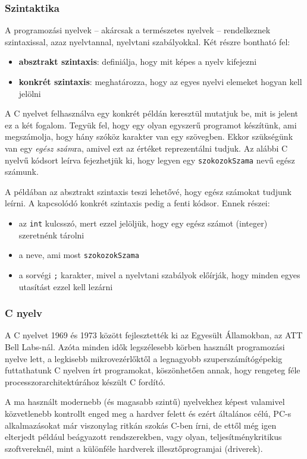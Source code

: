 \subsubsection{Szintaktika} 
A programozási nyelvek -- akárcsak a természetes nyelvek -- rendelkeznek szintaxissal, azaz nyelvtannal, nyelvtani szabályokkal. Két részre bontható fel:
\begin{itemize}
  \item \textbf{absztrakt szintaxis}: definiálja, hogy mit képes a nyelv kifejezni
  \item \textbf{konkrét szintaxis}: meghatározza, hogy az egyes nyelvi elemeket hogyan kell jelölni 
\end{itemize}

A C nyelvet felhasználva egy konkrét példán keresztül mutatjuk be, mit is jelent ez a két fogalom. Tegyük fel, hogy egy olyan egyszerű programot készítünk, ami megszámolja, hogy hány szóköz karakter van egy szövegben. Ekkor szükségünk van egy \emph{egész szám}ra, amivel ezt az értéket reprezentálni tudjuk. Az alábbi C nyelvű kódsort leírva fejezhetjük ki, hogy legyen egy \texttt{szokozokSzama} nevű egész számunk.

\clisting

A példában az absztrakt szintaxis teszi lehetővé, hogy egész számokat tudjunk leírni. A kapcsolódó konkrét szintaxis pedig a fenti kódsor. Ennek részei:
\begin{itemize}
  \item az \texttt{int} kulcsszó, mert ezzel jelöljük, hogy egy egész számot (integer) szeretnénk tárolni
  \item a neve, ami most \texttt{szokozokSzama}
  \item a sorvégi \texttt{;} karakter, mivel a nyelvtani szabályok előírják, hogy minden egyes utasítást ezzel kell lezárni
\end{itemize}


\subsubsection{C nyelv}
A C nyelvet 1969 és 1973 között fejlesztették ki az Egyesült Államokban, az ATT Bell Labs-nál. Azóta minden idők legszélesebb körben használt programozási nyelve lett, a legkisebb mikrovezérlőktől a legnagyobb szuperszámítógépekig futtathatunk C nyelven írt programokat, köszönhetően annak, hogy rengeteg féle processzorarchitektúrához készült C fordító.

A ma használt modernebb (és magasabb szintű) nyelvekhez képest valamivel közvetlenebb kontrollt enged meg a hardver felett és ezért általános célú, PC-s alkalmazásokat már viszonylag ritkán szokás C-ben írni, de ettől még igen elterjedt például beágyazott rendszerekben, vagy olyan, teljesítménykritikus szoftvereknél, mint a különféle hardverek illesztőprogramjai (driverek).

